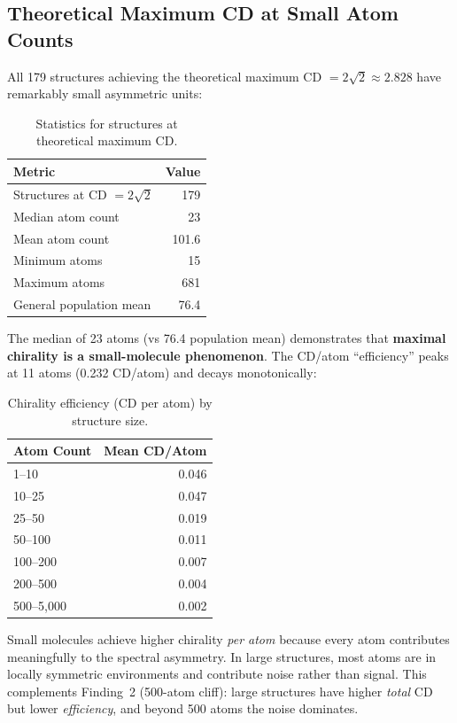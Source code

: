 \documentclass[11pt,a4paper]{article}
\begin{document}
\subsection{Theoretical Maximum CD at Small Atom Counts}

All 179 structures achieving the theoretical maximum CD $= 2\sqrt{2} \approx 2.828$ have remarkably small asymmetric units:

\begin{table}[H]
\centering
\caption{Statistics for structures at theoretical maximum CD.}
\label{tab:maxcd}
\begin{tabular}{lr}
\toprule
Metric & Value \\
\midrule
Structures at CD $= 2\sqrt{2}$ & 179 \\
Median atom count & 23 \\
Mean atom count & 101.6 \\
Minimum atoms & 15 \\
Maximum atoms & 681 \\
General population mean & 76.4 \\
\bottomrule
\end{tabular}
\end{table}

\noindent The median of 23 atoms (vs 76.4 population mean) demonstrates that \textbf{maximal chirality is a small-molecule phenomenon}. The CD/atom ``efficiency'' peaks at 11 atoms (0.232 CD/atom) and decays monotonically:

\begin{table}[H]
\centering
\caption{Chirality efficiency (CD per atom) by structure size.}
\label{tab:efficiency}
\begin{tabular}{lr}
\toprule
Atom Count & Mean CD/Atom \\
\midrule
1--10 & 0.046 \\
10--25 & 0.047 \\
25--50 & 0.019 \\
50--100 & 0.011 \\
100--200 & 0.007 \\
200--500 & 0.004 \\
500--5,000 & 0.002 \\
\bottomrule
\end{tabular}
\end{table}

\noindent Small molecules achieve higher chirality \emph{per atom} because every atom contributes meaningfully to the spectral asymmetry. In large structures, most atoms are in locally symmetric environments and contribute noise rather than signal. This complements Finding~2 (500-atom cliff): large structures have higher \emph{total} CD but lower \emph{efficiency}, and beyond 500 atoms the noise dominates.
\end{document}

